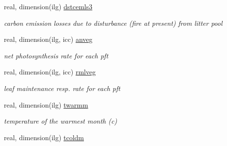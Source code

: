 \begin{DoxyCompactItemize}
\item 
\hypertarget{structctem__statevars_1_1veg__gat_ab34a60d0d1e3b3b0c76af0cb61d331ab}{}real, dimension(ilg) \hyperlink{structctem__statevars_1_1veg__gat_ab34a60d0d1e3b3b0c76af0cb61d331ab}{dstcemls3}\label{structctem__statevars_1_1veg__gat_ab34a60d0d1e3b3b0c76af0cb61d331ab}

\begin{DoxyCompactList}\small\item\em carbon emission losses due to disturbance (fire at present) from litter pool \end{DoxyCompactList}\item 
\hypertarget{structctem__statevars_1_1veg__gat_a7764723050312189f092c5783d86653e}{}real, dimension(ilg, icc) \hyperlink{structctem__statevars_1_1veg__gat_a7764723050312189f092c5783d86653e}{anveg}\label{structctem__statevars_1_1veg__gat_a7764723050312189f092c5783d86653e}

\begin{DoxyCompactList}\small\item\em net photosynthesis rate for each pft \end{DoxyCompactList}\item 
\hypertarget{structctem__statevars_1_1veg__gat_ae0cc8f257424a7fea8d06048f1bcbf4f}{}real, dimension(ilg, icc) \hyperlink{structctem__statevars_1_1veg__gat_ae0cc8f257424a7fea8d06048f1bcbf4f}{rmlveg}\label{structctem__statevars_1_1veg__gat_ae0cc8f257424a7fea8d06048f1bcbf4f}

\begin{DoxyCompactList}\small\item\em leaf maintenance resp. rate for each pft \end{DoxyCompactList}\item 
\hypertarget{structctem__statevars_1_1veg__gat_a6b97f459de178773e1d7d1278e6014a3}{}real, dimension(ilg) \hyperlink{structctem__statevars_1_1veg__gat_a6b97f459de178773e1d7d1278e6014a3}{twarmm}\label{structctem__statevars_1_1veg__gat_a6b97f459de178773e1d7d1278e6014a3}

\begin{DoxyCompactList}\small\item\em temperature of the warmest month (c) \end{DoxyCompactList}\item 
\hypertarget{structctem__statevars_1_1veg__gat_a6f107db053b78d41b8f24d14ef1be762}{}real, dimension(ilg) \hyperlink{structctem__statevars_1_1veg__gat_a6f107db053b78d41b8f24d14ef1be762}{tcoldm}\label{structctem__statevars_1_1veg__gat_a6f107db053b78d41b8f24d14ef1be762}


\end{DoxyCompactItemize}
